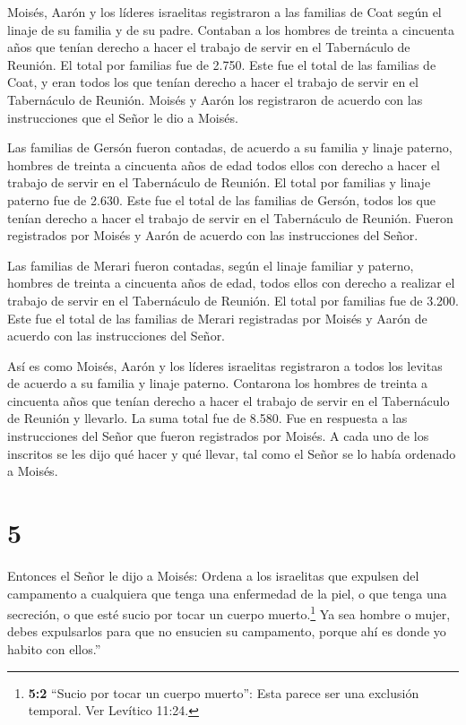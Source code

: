  Moisés, Aarón y los líderes israelitas registraron a las
familias de Coat según el linaje de su familia y de su padre.
 Contaban a los hombres de treinta a cincuenta años que
tenían derecho a hacer el trabajo de servir en el Tabernáculo de
Reunión.  El total por familias fue de 2.750. 
Este fue el total de las familias de Coat, y eran todos los que tenían
derecho a hacer el trabajo de servir en el Tabernáculo de Reunión.
Moisés y Aarón los registraron de acuerdo con las instrucciones que el
Señor le dio a Moisés.

 Las familias de Gersón fueron contadas, de acuerdo a su
familia y linaje paterno,  hombres de treinta a cincuenta
años de edad todos ellos con derecho a hacer el trabajo de servir en el
Tabernáculo de Reunión.  El total por familias y linaje
paterno fue de 2.630.  Este fue el total de las familias de
Gersón, todos los que tenían derecho a hacer el trabajo de servir en el
Tabernáculo de Reunión. Fueron registrados por Moisés y Aarón de acuerdo
con las instrucciones del Señor.

 Las familias de Merari fueron contadas, según el linaje
familiar y paterno,  hombres de treinta a cincuenta años de
edad, todos ellos con derecho a realizar el trabajo de servir en el
Tabernáculo de Reunión.  El total por familias fue de
3.200.  Este fue el total de las familias de Merari
registradas por Moisés y Aarón de acuerdo con las instrucciones del
Señor.

 Así es como Moisés, Aarón y los líderes israelitas
registraron a todos los levitas de acuerdo a su familia y linaje
paterno.  Contarona los hombres de treinta a cincuenta años
que tenían derecho a hacer el trabajo de servir en el Tabernáculo de
Reunión y llevarlo.  La suma total fue de 8.580.
 Fue en respuesta a las instrucciones del Señor que fueron
registrados por Moisés. A cada uno de los inscritos se les dijo qué
hacer y qué llevar, tal como el Señor se lo había ordenado a Moisés.

\hypertarget{section-4}{%
\section{5}\label{section-4}}

 Entonces el Señor le dijo a Moisés:  Ordena a
los israelitas que expulsen del campamento a cualquiera que tenga una
enfermedad de la piel, o que tenga una secreción, o que esté sucio por
tocar un cuerpo muerto.\footnote{\textbf{5:2} ``Sucio por tocar un
  cuerpo muerto'': Esta parece ser una exclusión temporal. Ver Levítico
  11:24.}  Ya sea hombre o mujer, debes expulsarlos para que
no ensucien su campamento, porque ahí es donde yo habito con ellos.''

